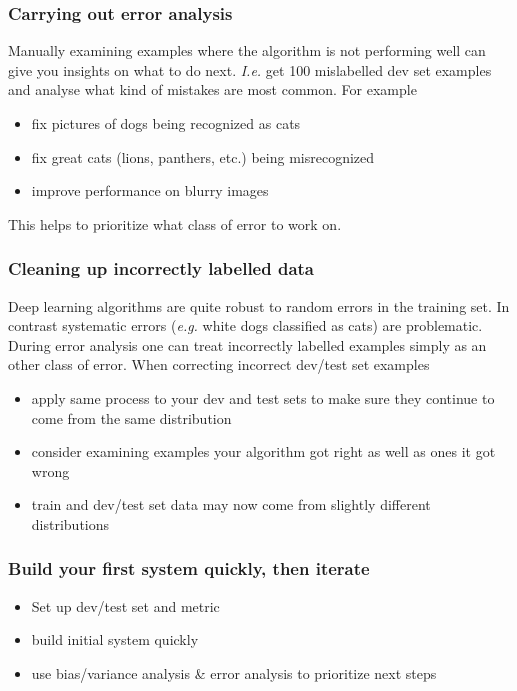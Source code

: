 \documentclass{article}
\begin{document}
\subsubsection{Carrying out error analysis}
Manually examining examples where the algorithm is not performing well can give you insights on what to do next.
\emph{I.e.} get 100 mislabelled dev set examples and analyse what kind of mistakes are most common.
For example
\begin{itemize}
  \item fix pictures of dogs being recognized as cats
  \item fix great cats (lions, panthers, etc.) being misrecognized
  \item improve performance on blurry images
\end{itemize}
This helps to prioritize what class of error to work on.

\subsubsection{Cleaning up incorrectly labelled data}
Deep learning algorithms are quite robust to random errors in the training set.
In contrast systematic errors (\emph{e.g.} white dogs classified as cats) are problematic.
During error analysis one can treat incorrectly labelled examples simply as an other class of error.
When correcting incorrect dev/test set examples
\begin{itemize}
  \item apply same process to your dev and test sets to make sure they continue to come from the same distribution
  \item consider examining examples your algorithm got right as well as ones it got wrong
  \item train and dev/test set data may now come from slightly different distributions
\end{itemize}

\subsubsection{Build your first system quickly, then iterate}
\begin{itemize}
  \item Set up dev/test set and metric
  \item build initial system quickly
  \item use bias/variance analysis \& error analysis to prioritize next steps
\end{itemize}
\end{document}
